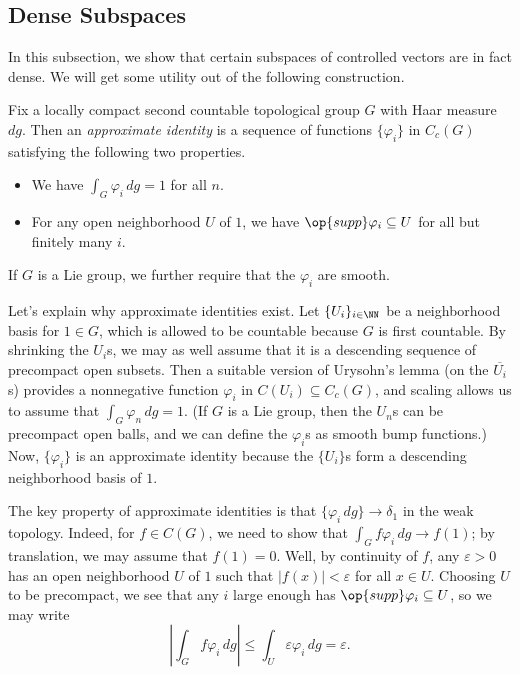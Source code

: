 \documentclass[../notes.tex]{subfiles}
\begin{document}
\subsection{Dense Subspaces}
In this subsection, we show that certain subspaces of controlled vectors are in fact dense. We will get some utility out of the following construction.
\begin{definition}
	Fix a locally compact second countable topological group $G$ with Haar measure $dg$. Then an \textit{approximate identity} is a sequence of functions $\{\varphi_i\}$ in $C_c(G)$ satisfying the following two properties.
	\begin{itemize}
		\item We have $\int_G\varphi_i\,dg=1$ for all $n$.
		\item For any open neighborhood $U$ of $1$, we have $\op{supp}\varphi_i\subseteq U$ for all but finitely many $i$.
	\end{itemize}
	If $G$ is a Lie group, we further require that the $\varphi_i$ are smooth.
\end{definition}
\begin{remark} \label{rem:get-approx-id}
	Let's explain why approximate identities exist. Let $\{U_i\}_{i\in\NN}$ be a neighborhood basis for $1\in G$, which is allowed to be countable because $G$ is first countable. By shrinking the $U_i$s, we may as well assume that it is a descending sequence of precompact open subsets. Then a suitable version of Urysohn's lemma (on the $\overline{U_i}$s) provides a nonnegative function $\varphi_i$ in $C(U_i)\subseteq C_c(G)$, and scaling allows us to assume that $\int_G\varphi_n\,dg=1$. (If $G$ is a Lie group, then the $U_n$s can be precompact open balls, and we can define the $\varphi_i$s as smooth bump functions.) Now, $\{\varphi_i\}$ is an approximate identity because the $\{U_i\}$s form a descending neighborhood basis of $1$.
\end{remark}
\begin{remark} \label{rem:use-approx-id}
	The key property of approximate identities is that $\{\varphi_i\,dg\}\to\delta_1$ in the weak topology. Indeed, for $f\in C(G)$, we need to show that $\int_Gf\varphi_i\,dg\to f(1)$; by translation, we may assume that $f(1)=0$. Well, by continuity of $f$, any $\varepsilon>0$ has an open neighborhood $U$ of $1$ such that $\left|f(x)\right|<\varepsilon$ for all $x\in U$. Choosing $U$ to be precompact, we see that any $i$ large enough has $\op{supp}\varphi_i\subseteq U$, so we may write
	\[\left|\int_Gf\varphi_i\,dg\right|\le\int_U\varepsilon\varphi_i\,dg=\varepsilon.\]
\end{remark}
\end{document}
